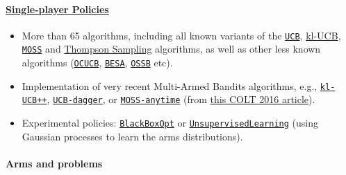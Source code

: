 \hypertarget{single-player-policies}{%
\paragraph{\texorpdfstring{\href{https://smpybandits.github.io/docs/Policies.html}{Single-player
Policies}}{Single-player Policies}}\label{single-player-policies}}

\begin{itemize}
\tightlist
\item
  More than 65 algorithms, including all known variants of the
  \href{https://smpybandits.github.io/docs/Policies.UCB.html}{\texttt{UCB}},
  \href{https://smpybandits.github.io/docs/Policies.klUCB.html}{kl-UCB},
  \href{https://smpybandits.github.io/docs/Policies.MOSS.html}{\texttt{MOSS}}
  and
  \href{https://smpybandits.github.io/docs/Policies.Thompson.html}{Thompson
  Sampling} algorithms, as well as other less known algorithms
  (\href{https://smpybandits.github.io/docs/Policies.OCUCB.html}{\texttt{OCUCB}},
  \href{https://smpybandits.github.io/docs/Policies.OCUCB.html}{\texttt{BESA}},
  \href{https://smpybandits.github.io/docs/Policies.OSSB.html}{\texttt{OSSB}}
  etc).
\item
  Implementation of very recent Multi-Armed Bandits algorithms, e.g.,
  \href{https://smpybandits.github.io/docs/Policies.klUCBPlusPlus.html}{\texttt{kl-UCB++}},
  \href{https://smpybandits.github.io/docs/Policies.UCBdagger.html}{\texttt{UCB-dagger}},
  or
  \href{https://smpybandits.github.io/docs/Policies.MOSSAnytime.html}{\texttt{MOSS-anytime}}
  (from \href{http://proceedings.mlr.press/v48/degenne16.pdf}{this COLT
  2016 article}).
\item
  Experimental policies:
  \href{https://smpybandits.github.io/docs/Policies.BlackBoxOpt.html}{\texttt{BlackBoxOpt}}
  or
  \href{https://smpybandits.github.io/docs/Policies.UnsupervisedLearning.html}{\texttt{UnsupervisedLearning}}
  (using Gaussian processes to learn the arms distributions).
\end{itemize}

\hypertarget{arms-and-problems}{%
\paragraph{Arms and problems}\label{arms-and-problems}}

